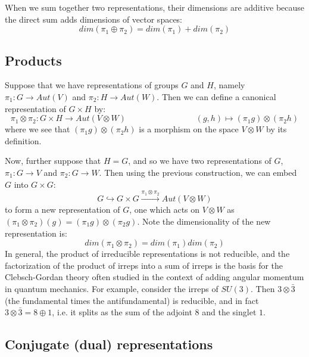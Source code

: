 \documentclass[11pt, oneside]{article}   	%
\theoremstyle{definition}
\begin{document}
When we sum together two representations, their dimensions are additive because the direct sum adds 
dimensions of vector spaces:
\begin{equation}
	dim(\pi_1\oplus\pi_2) = dim(\pi_1) + dim(\pi_2)
\end{equation}

\subsection{Products}

Suppose that we have representations of groups $G$ and $H$, namely $\pi_1 : G\rightarrow Aut(V)$ and 
$\pi_2 : H\rightarrow Aut(W)$. Then we can define a canonical representation of $G\times H$ by:
\begin{equation}
	\pi_1\otimes\pi_2 : G\times H\rightarrow Aut(V\otimes W)\;\;\;\;\;\;\;\;\;\;\;\;\;\;\;\;\;\;\;\;\;\;\;\;\;\;\;\;\;\;
	(g, h)\mapsto (\pi_1 g)\otimes (\pi_2 h)
\end{equation}
where we see that $(\pi_1 g)\otimes (\pi_2 h)$ is a morphism on the space $V\otimes W$ by its 
definition. 

Now, further suppose that $H = G$, and so we have two representations of $G$, $\pi_1 : G\rightarrow V$ 
and $\pi_2 : G\rightarrow W$. Then using the previous construction, we can embed $G$ into $G\times G$:
\begin{equation}
	G\hookrightarrow G\times G \xrightarrow{\pi_1\otimes\pi_2} Aut(V\otimes W)
\end{equation}
to form a new representation of $G$, one which acts on $V\otimes W$ as $(\pi_1\otimes\pi_2)(g) = 
(\pi_1 g)\otimes (\pi_2 g)$. Note the dimensionality of the new representation is: 
\begin{equation}
	dim(\pi_1\otimes\pi_2) = dim(\pi_1)dim(\pi_2)
\end{equation}
In general, the product of irreducible representations is not reducible, and 
the factorization of the product of irreps into a sum of irreps is the basis for the Clebsch-Gordan theory 
often studied in the context of adding angular momentum in quantum mechanics. For example, consider 
the irreps of $SU(3)$. Then $3\otimes\bar 3$ (the fundamental times the antifundamental) is reducible, 
and in fact $3\otimes\bar 3 = 8\oplus 1$, i.e. it splits as the sum of the adjoint $8$ and the singlet $1$. 

\subsection{Conjugate (dual) representations}
\end{document}
